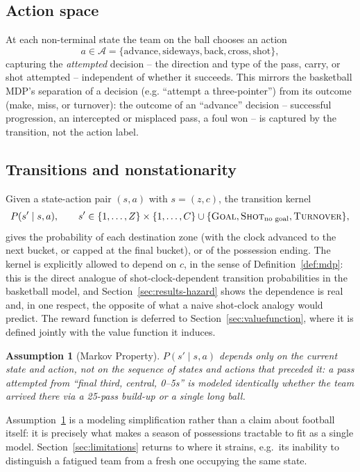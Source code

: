\documentclass[11pt]{article}
\theoremstyle{plain}
\newtheorem{assumption}{Assumption}[section]
\theoremstyle{definition}
\theoremstyle{remark}
\newcommand{\GOAL}{\textsc{Goal}}
\newcommand{\NOGOAL}{\textsc{Shot}_{\text{no goal}}}
\newcommand{\TURN}{\textsc{Turnover}}
\begin{document}
\subsection{Action space}
At each non-terminal state the team on the ball chooses an action
\begin{equation}
a \in \mathcal{A} = \{\text{advance}, \text{sideways}, \text{back}, \text{cross}, \text{shot}\},
\end{equation}
capturing the \emph{attempted} decision -- the direction and type of the pass, carry, or shot attempted -- independent of whether it succeeds. This mirrors the basketball MDP's separation of a decision (e.g. ``attempt a three-pointer'') from its outcome (make, miss, or turnover): the outcome of an ``advance'' decision -- successful progression, an intercepted or misplaced pass, a foul won -- is captured by the transition, not the action label.

\subsection{Transitions and nonstationarity}
Given a state-action pair $(s,a)$ with $s=(z,c)$, the transition kernel
\begin{equation}
P(s' \mid s, a), \qquad s' \in \{1,\dots,Z\}\times\{1,\dots,C\} \cup \{\GOAL, \NOGOAL, \TURN\},
\end{equation}
gives the probability of each destination zone (with the clock advanced to the next bucket, or capped at the final bucket), or of the possession ending. The kernel is explicitly allowed to depend on $c$, in the sense of Definition~\ref{def:mdp}: this is the direct analogue of shot-clock-dependent transition probabilities in the basketball model, and Section~\ref{sec:results-hazard} shows the dependence is real and, in one respect, the opposite of what a naive shot-clock analogy would predict. The reward function is deferred to Section~\ref{sec:valuefunction}, where it is defined jointly with the value function it induces.

\begin{assumption}[Markov Property]
\label{assump:markov}
$P(s' \mid s, a)$ depends only on the current state and action, not on the sequence of states and actions that preceded it: a pass attempted from ``final third, central, 0--5s'' is modeled identically whether the team arrived there via a 25-pass build-up or a single long ball.
\end{assumption}

Assumption~\ref{assump:markov} is a modeling simplification rather than a claim about football itself: it is precisely what makes a season of possessions tractable to fit as a single model. Section~\ref{sec:limitations} returns to where it strains, e.g.\ its inability to distinguish a fatigued team from a fresh one occupying the same state.
\end{document}
